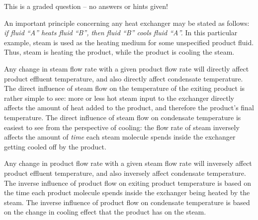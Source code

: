 \vfil 

\eject






This is a graded question -- no answers or hints given!







An important principle concerning any heat exchanger may be stated as follows: {\it if fluid ``A'' heats fluid ``B'', then fluid ``B'' cools fluid ``A''.}  In this particular example, steam is used as the heating medium for some unspecified product fluid.  Thus, steam is heating the product, while the product is cooling the steam.

\vskip 10pt

Any change in steam flow rate with a given product flow rate will directly affect product effluent temperature, and also directly affect condensate temperature.   The direct influence of steam flow on the temperature of the exiting product is rather simple to see: more or less hot steam input to the exchanger directly affects the amount of heat added to the product, and therefore the product's final temperature.  The direct influence of steam flow on condensate temperature is easiest to see from the perspective of cooling: the flow rate of steam inversely affects the amount of {\it time} each steam molecule spends inside the exchanger getting cooled off by the product.

\vskip 10pt

Any change in product flow rate with a given steam flow rate will inversely affect product effluent temperature, and also inversely affect condensate temperature.  The inverse influence of product flow on exiting product temperature is based on the time each product molecule spends inside the exchanger being heated by the steam.  The inverse influence of product flow on condensate temperature is based on the change in cooling effect that the product has on the steam.



